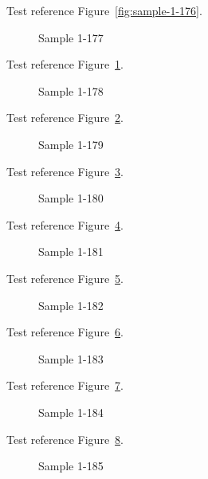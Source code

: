 Test reference Figure~\ref{fig:sample-1-176}.

\begin{figure}[tbhp]
\caption{Sample 1-177}
\label{fig:sample-1-177}
\end{figure}

Test reference Figure~\ref{fig:sample-1-177}.

\begin{figure}[tbhp]
\caption{Sample 1-178}
\label{fig:sample-1-178}
\end{figure}

Test reference Figure~\ref{fig:sample-1-178}.

\begin{figure}[tbhp]
\caption{Sample 1-179}
\label{fig:sample-1-179}
\end{figure}

Test reference Figure~\ref{fig:sample-1-179}.

\begin{figure}[tbhp]
\caption{Sample 1-180}
\label{fig:sample-1-180}
\end{figure}

Test reference Figure~\ref{fig:sample-1-180}.

\begin{figure}[tbhp]
\caption{Sample 1-181}
\label{fig:sample-1-181}
\end{figure}

Test reference Figure~\ref{fig:sample-1-181}.

\begin{figure}[tbhp]
\caption{Sample 1-182}
\label{fig:sample-1-182}
\end{figure}

Test reference Figure~\ref{fig:sample-1-182}.

\begin{figure}[tbhp]
\caption{Sample 1-183}
\label{fig:sample-1-183}
\end{figure}

Test reference Figure~\ref{fig:sample-1-183}.

\begin{figure}[tbhp]
\caption{Sample 1-184}
\label{fig:sample-1-184}
\end{figure}

Test reference Figure~\ref{fig:sample-1-184}.

\begin{figure}[tbhp]
\caption{Sample 1-185}
\label{fig:sample-1-185}
\end{figure}

